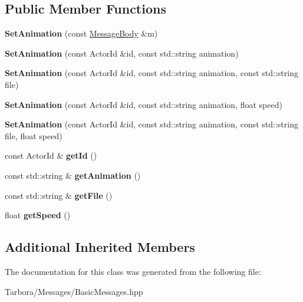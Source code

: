 \subsection*{Public Member Functions}
\begin{DoxyCompactItemize}
\item 
\mbox{\label{classTarbora_1_1Message_1_1SetAnimation_a96b9afac7a39b93c39469932350921fa}} 
{\bfseries Set\+Animation} (const \hyperlink{classTarbora_1_1MessageBody}{Message\+Body} \&m)
\item 
\mbox{\label{classTarbora_1_1Message_1_1SetAnimation_ad1ffaf593eebd96fc877a9923efa42c1}} 
{\bfseries Set\+Animation} (const Actor\+Id \&id, const std\+::string animation)
\item 
\mbox{\label{classTarbora_1_1Message_1_1SetAnimation_ab5e19da339e155f0df3f078999f55559}} 
{\bfseries Set\+Animation} (const Actor\+Id \&id, const std\+::string animation, const std\+::string file)
\item 
\mbox{\label{classTarbora_1_1Message_1_1SetAnimation_ada2567d806f1ee536d309d4ec887fc90}} 
{\bfseries Set\+Animation} (const Actor\+Id \&id, const std\+::string animation, float speed)
\item 
\mbox{\label{classTarbora_1_1Message_1_1SetAnimation_a6f03646f65068fc51bacfff098415df3}} 
{\bfseries Set\+Animation} (const Actor\+Id \&id, const std\+::string animation, const std\+::string file, float speed)
\item 
\mbox{\label{classTarbora_1_1Message_1_1SetAnimation_a8b4b7e7832bfd27bfb790e01dad06e0f}} 
const Actor\+Id \& {\bfseries get\+Id} ()
\item 
\mbox{\label{classTarbora_1_1Message_1_1SetAnimation_a073a6af722e25bcbbc372a93a1d5dc2a}} 
const std\+::string \& {\bfseries get\+Animation} ()
\item 
\mbox{\label{classTarbora_1_1Message_1_1SetAnimation_ab0cc3cc41733419f97ee1c1e780f0a82}} 
const std\+::string \& {\bfseries get\+File} ()
\item 
\mbox{\label{classTarbora_1_1Message_1_1SetAnimation_a72ab25626eff2fff4d9f769585bf7aae}} 
float {\bfseries get\+Speed} ()
\end{DoxyCompactItemize}
\subsection*{Additional Inherited Members}


The documentation for this class was generated from the following file\+:\begin{DoxyCompactItemize}
\item 
Tarbora/\+Messages/Basic\+Messages.\+hpp\end{DoxyCompactItemize}
